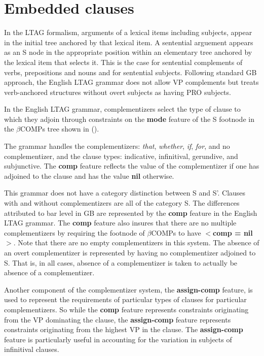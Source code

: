 \section{Embedded clauses}
In the LTAG formalism,  arguments of a lexical items including
subjects, appear in the initial tree anchored by that lexical item.  A
sentential arguement appears  as an S node in the appropriate
position within an elementary tree anchored by the lexical item that
selects it. This is the case for sentential
complements of verbs, prepositions and nouns and for sentential
subjects. Following standard GB approach, the English LTAG grammar
does not allow VP complements but treats verb-anchored structures
without overt subjects as having PRO subjects.  

In the English LTAG grammar, complementizers select the type of clause
to which they adjoin through constraints on the {\bf mode} feature
of the S footnode in the $\beta$COMPs tree shown in ().

The grammar handles the complementizers: {\it that\/}, {\it
whether\/}, {\it if\/}, {\it for\/}, and no complementizer, and the
clause types: indicative, infinitival, gerundive, and subjunctive.
The {\bf comp} feature reflects the value of the complementizer if one
has adjoined to the clause and has the value {\bf nil} otherwise.

 This grammar does not have a category distinction between S and
S'. Clauses with and without complementizers are all of the category
S. The differences attributed to bar level in GB are represented by
the {\bf comp} feature in the English LTAG grammar.  The {\bf
comp} feature also insures that there are no multiple
complementizers by requiring the footnode of $\beta$COMPs to have {\bf
$<$comp = nil$>$}.  Note that there are no empty
complementizers in this system. The absence of an overt complementizer
is represented by having no complementizer adjoined to S. That is, in
all cases, absence of a complementizer is taken to actually be absence
of a complementizer.

Another component of the complementizer system, the {\bf
assign-comp} feature, is used to represent the requirements of
particular types of clauses for particular complementizers.  So while
the {\bf comp} feature represents  constraints originating from the VP
dominating the clause, the {\bf assign-comp} feature represents constraints
originating from the highest VP in the clause. The {\bf assign-comp}
feature is particularly useful in accounting for the variation in
subjects of infinitival clauses.  

